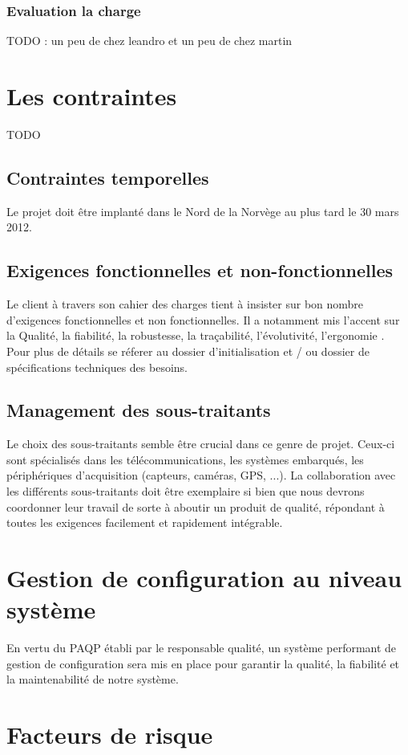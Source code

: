 \subsubsection{Evaluation la charge}
TODO : un peu de chez leandro et un peu de chez martin


\section{Les contraintes}
TODO
\subsection{Contraintes temporelles}
Le projet doit être implanté dans le Nord de la Norvège au plus tard le 30 mars 2012.

\subsection{Exigences fonctionnelles et non-fonctionnelles}
Le client à travers son cahier des charges tient à insister sur bon nombre d'exigences fonctionnelles et non fonctionnelles. Il a notamment mis
l'accent sur la Qualité, la fiabilité,
la robustesse, la traçabilité, l'évolutivité, l'ergonomie . Pour plus de détails se réferer au dossier d'initialisation et / ou dossier de spécifications techniques des besoins.

\subsection{Management des sous-traitants}
Le choix des sous-traitants semble être crucial dans ce genre de projet. Ceux-ci sont spécialisés dans les
télécommunications, les systèmes embarqués, les périphériques d’acquisition (capteurs,
caméras, GPS, ...). La collaboration avec les différents sous-traitants doit être exemplaire si bien que nous devrons coordonner leur travail de sorte à aboutir un produit de qualité, répondant à toutes les exigences facilement et rapidement intégrable.

\section{Gestion de configuration au niveau système}
En vertu du PAQP établi par le responsable qualité, un système performant de gestion de configuration sera mis en
place pour garantir la qualité, la fiabilité et la maintenabilité de notre système.

\section{Facteurs de risque}

